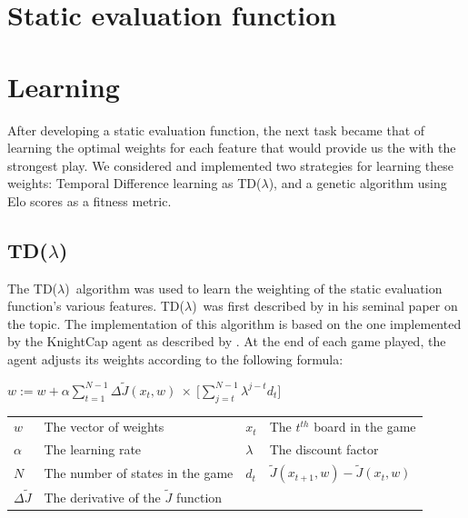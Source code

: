 \documentclass[11pt]{article}
\newcommand{\tdl}{TD($\lambda$)}
\begin{document}
\section{Static evaluation function}
\label{sec:eval_func}

\section{Learning}
\label{sec:learning}

After developing a static evaluation function, the next task became that of
learning the optimal weights for each feature that would provide us the with
the strongest play. We considered and implemented two strategies for learning
these weights: Temporal Difference learning as \tdl, and a genetic algorithm
using Elo scores as a fitness metric.

\subsection{\tdl}
\label{sub:tdlambda}

The \tdl\ algorithm was used to learn the weighting of the static evaluation
function's various features. \tdl\ was first described by \citet{Sutton1988}
in his seminal paper on the topic. The implementation of this algorithm is
based on the one implemented by the KnightCap agent as described by
\citet{Baxter1997}.  At the end of each game played, the agent adjusts its
weights according to the following formula:

\begin{center}

    $\displaystyle w := w + \alpha \sum _{t=1} ^{N-1} \Delta \tilde{J}(x_t,w) \: \times \: \Big[ \sum ^ {N-1} _{j=t} \lambda^{j-t} d_t \Big] $\\
        
    \begin{tabular}{  l l | l l }
      $w$                   & The vector of weights                         &$x_t$  & The $t^{th}$ board in the game \\
      $\alpha$              & The learning rate                             &$\lambda$      &The discount factor \\
      $N$                   & The number of states in the game              &$d_t$          &$\tilde{J}(x_{t+1},w) - \tilde{J}(x_t,w)$\\
      $\Delta \tilde{J}$    & The derivative of the $\tilde{J}$ function    &               &\\
    \end{tabular}
\end{center}
\end{document}
